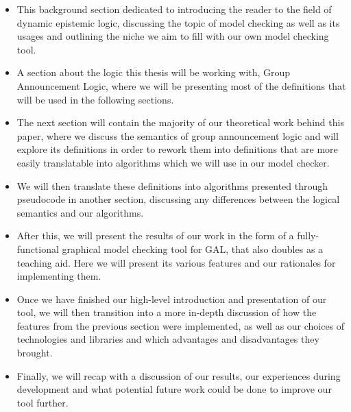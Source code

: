 \begin{itemize}
	\item{This background section dedicated to introducing the reader to the field of dynamic epistemic logic, discussing the topic of model checking as well as its usages and outlining the niche we aim to fill with our own model checking tool.}
	\item{A section about the logic this thesis will be working with, Group Announcement Logic, where we will be presenting most of the definitions that will be used in the following sections.}
	\item{The next section will contain the majority of our theoretical work behind this paper, where we discuss the semantics of group announcement logic and will explore its definitions in order to rework them into definitions that are more easily translatable into algorithms which we will use in our model checker.}
	\item{We will then translate these definitions into algorithms presented through pseudocode in another section, discussing any differences between the logical semantics and our algorithms.}
	\item{After this, we will present the results of our work in the form of a fully-functional graphical model checking tool for GAL, that also doubles as a teaching aid. Here we will present its various features and our rationales for implementing them.}
	\item{Once we have finished our high-level introduction and presentation of our tool, we will then transition into a more in-depth discussion of how the features from the previous section were implemented, as well as our choices of technologies and libraries and which advantages and disadvantages they brought.}
	\item{Finally, we will recap with a discussion of our results, our experiences during development and what potential future work could be done to improve our tool further.}
\end{itemize}



